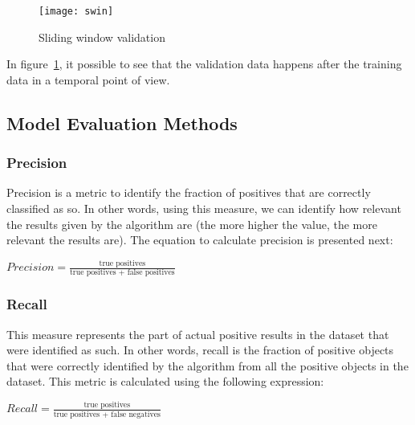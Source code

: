 \begin{figure}[!h]
  \begin{center}
    \leavevmode
    \texttt{[image: swin]}
    \caption{Sliding window validation}
    \label{fig:swin}
  \end{center}
\end{figure}
\FloatBarrier

In figure~\ref{fig:swin}, it possible to see that the validation data happens
after the training data in a temporal point of view.

\subsection{Model Evaluation Methods}

\subsubsection{Precision}

Precision is a metric to identify the fraction of positives that are correctly
classified as so. In other words, using this measure, we can identify how relevant the
results given by the algorithm are (the more higher the value, the more relevant
the results are). The equation to calculate precision is presented next:

\begin{center}
\Large
\begin{math}
Precision = \frac{\text{true positives}}{\text{true positives + false positives}}
\end{math}
\normalsize
\end{center}


\subsubsection{Recall}

This measure represents the part of actual positive results in the dataset that
were identified as such. In other words, recall is the fraction of positive
objects that were correctly identified by the algorithm from all the positive objects in the
dataset. This metric is calculated using the following expression:

\begin{center}
\Large
\begin{math}
Recall = \frac{\text{true positives}}{\text{true positives + false negatives}}
\end{math}
\normalsize
\end{center}

